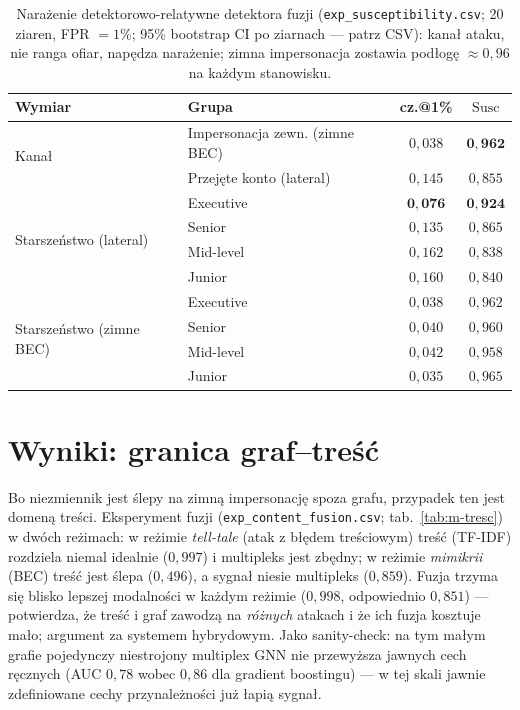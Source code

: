 \begin{table}[htbp]\centering\small
\begin{tabular}{llcc}
\toprule
Wymiar & Grupa & cz.@1\% & $\mathrm{Susc}$ \\
\midrule
\multirow{2}{*}{Kanał}
 & Impersonacja zewn. (zimne BEC) & $0{,}038$ & $\mathbf{0{,}962}$ \\
 & Przejęte konto (lateral)       & $0{,}145$ & $0{,}855$ \\
\midrule
\multirow{4}{*}{Starszeństwo (lateral)}
 & Executive & $\mathbf{0{,}076}$ & $\mathbf{0{,}924}$ \\
 & Senior    & $0{,}135$ & $0{,}865$ \\
 & Mid-level & $0{,}162$ & $0{,}838$ \\
 & Junior    & $0{,}160$ & $0{,}840$ \\
\midrule
\multirow{4}{*}{Starszeństwo (zimne BEC)}
 & Executive & $0{,}038$ & $0{,}962$ \\
 & Senior    & $0{,}040$ & $0{,}960$ \\
 & Mid-level & $0{,}042$ & $0{,}958$ \\
 & Junior    & $0{,}035$ & $0{,}965$ \\
\bottomrule
\end{tabular}
\caption{Narażenie detektorowo-relatywne detektora fuzji
(\texttt{exp\_susceptibility.csv}; 20 ziaren, FPR $=1\%$; 95\%
bootstrap CI po ziarnach --- patrz CSV): kanał ataku, nie ranga
ofiar, napędza narażenie; zimna impersonacja zostawia podłogę
$\approx0{,}96$ na każdym stanowisku.}
\label{tab:m-susc}
\end{table}

\section{Wyniki: granica graf--treść}
\label{sec:m-tresc}

Bo niezmiennik jest ślepy na zimną impersonację spoza grafu,
przypadek ten jest domeną treści. Eksperyment fuzji
(\texttt{exp\_content\_fusion.csv}; tab.~\ref{tab:m-tresc}) w dwóch
reżimach: w reżimie \emph{tell-tale} (atak z błędem treściowym)
treść (TF-IDF) rozdziela niemal idealnie ($0{,}997$) i multipleks
jest zbędny; w reżimie \emph{mimikrii} (BEC) treść jest ślepa
($0{,}496$), a sygnał niesie multipleks ($0{,}859$). Fuzja trzyma
się blisko lepszej modalności w każdym reżimie ($0{,}998$,
odpowiednio $0{,}851$) --- potwierdza, że treść i graf zawodzą
na \emph{różnych} atakach i że ich fuzja kosztuje mało; argument
za systemem hybrydowym. Jako sanity-check: na tym małym grafie
pojedynczy niestrojony multiplex GNN nie przewyższa jawnych cech
ręcznych (AUC $0{,}78$ wobec $0{,}86$ dla gradient boostingu) ---
w tej skali jawnie zdefiniowane cechy przynależności już łapią
sygnał.

